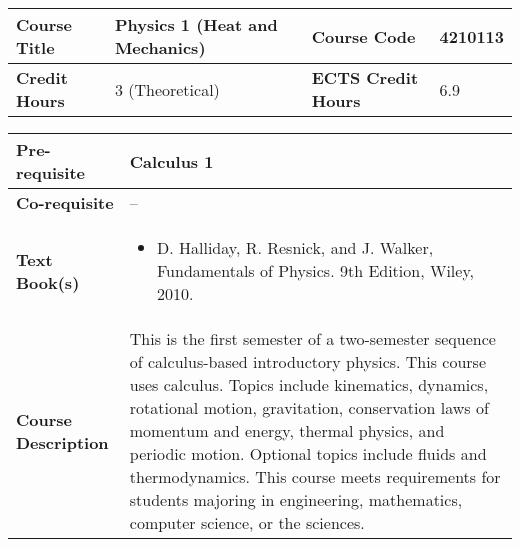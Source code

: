 \documentclass[12pt]{article}
\begin{document}
\begin{minipage}{\textwidth}
\begin{tabularx}{\textwidth}{|l|X|l|X|}
\hline
\textbf{Course Title}       &  Physics 1 (Heat and Mechanics) & \textbf{Course Code}       &  4210113 \\ \hline
\textbf{Credit Hours}       &  3 (Theoretical) & \textbf{ECTS Credit Hours}       &   6.9 \\ \hline
\end{tabularx}

\begin{tabularx}{\textwidth}{|l|X|}
\hline
\textbf{Pre-requisite}      & Calculus 1 \\ \hline
\textbf{Co-requisite}       &  -- \\ \hline
\textbf{Text Book(s)}      & \begin{minipage}{.70\textwidth}
					\begin{itemize} \itemsep-0.4em
						\vspace{3mm}
						\item D. Halliday, R. Resnick, and J. Walker, Fundamentals of Physics. 9th Edition, Wiley, 2010.
						\vspace{3mm}
					\end{itemize}
				\end{minipage}  \\ \hline
\textbf{Course Description} & \begin{minipage}{.70\textwidth}
					\vspace{3mm}
					This is the first semester of a two-semester sequence of calculus-based introductory physics. This course uses calculus. Topics include kinematics, dynamics, rotational motion, gravitation, conservation laws of momentum and energy, thermal physics, and periodic motion.  Optional topics include fluids and thermodynamics.  This course meets requirements for students majoring in engineering, mathematics, computer science, or the sciences.

					\vspace{3mm}
					\end{minipage} \\ \hline
\end{tabularx}
\end{minipage}


\bigskip
\bigskip
\end{document}
